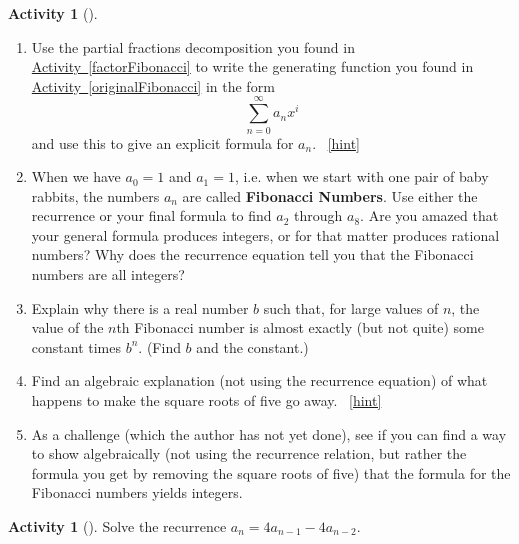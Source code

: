 \documentclass[10pt,]{book}
\newcommand{\terminology}[1]{\textbf{#1}}
\theoremstyle{plain}
\theoremstyle{definition}
\theoremstyle{definition}
\theoremstyle{definition}
\newtheorem{activity}[project]{Activity}
\numberwithin{equation}{chapter}
\begin{document}
\begin{activity}[]\label{solveFibonacci}
\leavevmode%
\begin{enumerate}[font=\bfseries,label=(\alph*),ref=\alph*]
\item\label{task-178} \hypertarget{p-955}{}%
Use the partial fractions decomposition you found in \hyperref[factorFibonacci]{Activity~\ref{factorFibonacci}} to write the generating function you found in \hyperref[originalFibonacci]{Activity~\ref{originalFibonacci}} in the form%
\begin{equation*}
\sum_{n=0}^\infty a_nx^i
\end{equation*}
and use this to give an explicit formula for \(a_n\).%
~\hfill{\tiny\hyperlink{a-207.a}{[hint]}\hypertarget{q-207.a}{}}\item\label{task-179} \hypertarget{p-958}{}%
When we have \(a_0=1\) and \(a_1=1\), i.e. when we start with one pair of baby rabbits, the numbers \(a_n\) are called \terminology{Fibonacci Numbers}.  Use either the recurrence or your final formula to find \(a_2\) through \(a_8\).  Are you amazed that your general formula produces integers, or for that matter produces rational numbers?  Why does the recurrence equation tell you that the Fibonacci numbers are all integers?%
\item\label{task-180} \hypertarget{p-960}{}%
Explain why there is a real number \(b\) such that, for large values of \(n\), the value of the \(n\)th Fibonacci number is almost exactly (but not quite) some constant times \(b^n\). (Find \(b\) and the constant.)%
\item\label{task-181} \hypertarget{p-962}{}%
Find an algebraic explanation (not using the recurrence equation) of what happens to make the square roots of five go away.%
~\hfill{\tiny\hyperlink{a-207.d}{[hint]}\hypertarget{q-207.d}{}}\item\label{task-182} \hypertarget{p-965}{}%
As a challenge (which the author has not yet done), see if you can find a way to show algebraically (not using the recurrence relation, but rather the formula you get by removing the square roots of five) that the formula for the Fibonacci numbers yields integers.%
\end{enumerate}
\end{activity}
\begin{activity}[]\label{activity-208}
\hypertarget{p-967}{}%
Solve the recurrence \(a_n= 4a_{n-1} - 4a_{n-2}\).%
\end{activity}
\typeout{************************************************}
\typeout{************************************************}
\end{document}
